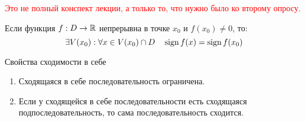 

\usepackage{xcolor}

\cfoot{}


    \textcolor{red}{Это не полный конспект лекции, а только то, что нужно было ко второму опросу.}

    \begin{theorem}
        Если функция $f : D\to\operatorname*{\mathbb{R}}$ непрерывна в точке $x_0$ и $f(x_0)\not=0$, то:
        $$\exists V(x_0) : \forall x\in V(x_0)\cap D \quad \operatorname{\text{sign}} f(x) = \operatorname{\text{sign}} f(x_0)$$
    \end{theorem}

    \begin{lemma}
        Свойства сходимости в себе

        \begin{enumerate}
            \item Сходящаяся в себе последовательность ограничена.
            \item Если у сходящейся в себе последовательности есть сходящаяся подпоследовательность, то сама последовательность сходится.
        \end{enumerate}
    \end{lemma}
